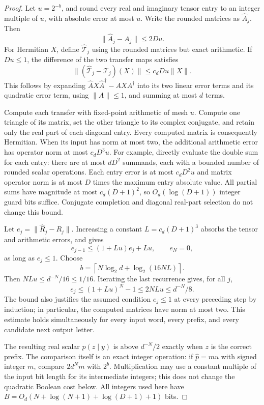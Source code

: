 \documentclass[11pt]{article}
\begin{document}
\begin{proof}
Let $u=2^{-b}$, and round every real and imaginary tensor entry
to an integer multiple of $u$, with absolute error at most $u$.
Write the rounded matrices as $\widehat A_j$. Then
\[
 \|\widehat A_j-A_j\|\le2Du.
\]
For Hermitian $X$, define $\widehat{\mathcal T}_j$ using the
rounded matrices but exact arithmetic. If $Du\le1$, the difference
of the two transfer maps satisfies
\[
 \|(\widehat{\mathcal T}_j-\mathcal T_j)(X)\|
 \le c_dDu\|X\|.
\]
This follows by expanding
$\widehat A X\widehat A^\dagger-A X A^\dagger$ into its
two linear error terms and its quadratic error term, using
$\|A\|\le1$, and summing at most $d$ terms.

Compute each transfer with fixed-point arithmetic of mesh $u$.
Compute one triangle of its matrix, set the other triangle to its
complex conjugate, and retain only the real part of each diagonal
entry. Every computed matrix is consequently Hermitian.
When its input has norm at most two, the additional arithmetic
error has operator norm at most $c_dD^3u$.
For example, directly evaluate the double sum for each entry:
there are at most $dD^2$ summands, each with a bounded number of
rounded scalar operations. Each entry error is at most
$c_dD^2u$ and matrix operator norm is at most $D$ times the
maximum entry absolute value. All partial sums have magnitude
at most $c_d(D+1)^2$, so $O_d(\log(D+1))$ integer guard bits
suffice. Conjugate completion and diagonal real-part selection
do not change this bound.

Let $e_j=\|\widehat R_j-R_j\|$.
Increasing a constant $L=c_d(D+1)^3$ absorbs the tensor and
arithmetic errors, and gives
\[
 e_{j-1}\le(1+Lu)e_j+Lu,\qquad e_N=0,
\]
as long as $e_j\le1$. Choose
\[
 b=\left\lceil
      N\log_2d+\log_2(16NL)\right\rceil.
\]
Then $NLu\le d^{-N}/16\le1/16$. Iterating the last recurrence
gives, for all $j$,
\[
 e_j\le(1+Lu)^N-1\le2NLu\le d^{-N}/8.
\]
The bound also justifies the assumed condition $e_j\le1$ at
every preceding step by induction; in particular, the computed
matrices have norm at most two.
This estimate holds simultaneously for every input word, every
prefix, and every candidate next output letter.

The resulting real scalar $\widehat p(z\mid y)$ is above
$d^{-N}/2$ exactly when $z$ is the correct prefix.
The comparison itself is an exact integer operation:
if $\widehat p=mu$ with signed integer $m$, compare
$2d^Nm$ with $2^b$.
Multiplication may use a constant multiple of the input bit
length for its intermediate integers; this does not change the
quadratic Boolean cost below. All integers used here have
$B=O_d(N+\log(N+1)+\log(D+1)+1)$ bits.


\end{proof}
\end{document}
